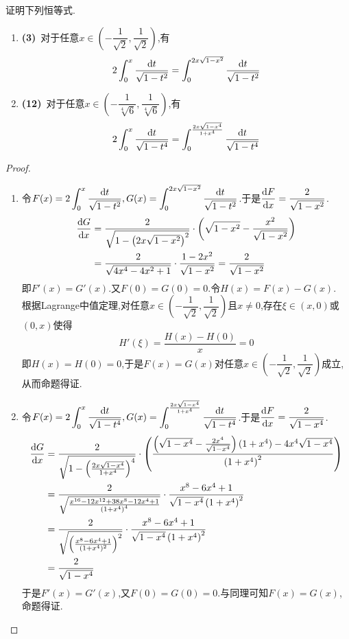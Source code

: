 \documentclass{ctexart}
\begin{document}
\begin{problem}[8.(15\songti{分})]
    证明下列恒等式.
    \begin{enumerate}[label=\tbf{(\arabic*)}]
        \item \textbf{(3)}\ 对于任意$x\in\left(-\dfrac{1}{\sqrt2},\dfrac{1}{\sqrt2}\right)$,有\[2\int_0^x\dfrac{\mathrm{d} t}{\sqrt{1-t^2}}=\int_0^{2x\sqrt{1-x^2}}\dfrac{\mathrm{d} t}{\sqrt{1-t^2}}\]
        \item \textbf{(12)}\ 对于任意$x\in\left(-\dfrac{1}{\sqrt[4]{6}},\dfrac{1}{\sqrt[4]{6}}\right)$,有\[2\int_0^x\dfrac{\mathrm{d} t}{\sqrt{1-t^4}}=\int_{0}^{\frac{2x\sqrt{1-x^4}}{1+x^4}}\dfrac{\mathrm{d} t}{\sqrt{1-t^4}}\]
    \end{enumerate}
\end{problem}
\begin{proof}
    \begin{enumerate}[label=\tbf{(\arabic*)}]
        \item 令$\displaystyle F(x)=2\int_0^x\dfrac{\mathrm{d} t}{\sqrt{1-t^2}},G(x)=\int_0^{2x\sqrt{1-x^2}}\dfrac{\mathrm{d} t}{\sqrt{1-t^2}}$.于是$\dfrac{\mathrm{d} F}{\mathrm{d} x}=\dfrac{2}{\sqrt{1-x^2}}$.
            \[\begin{aligned}
                \dfrac{\mathrm{d} G}{\mathrm{d} x}
                &= \dfrac{2}{\sqrt{1-\left(2x\sqrt{1-x^2}\right)^2}}\cdot\left(\sqrt{1-x^2}-\dfrac{x^2}{\sqrt{1-x^2}}\right) \\
                &= \dfrac{2}{\sqrt{4x^4-4x^2+1}}\cdot\dfrac{1-2x^2}{\sqrt{1-x^2}}=\dfrac{2}{\sqrt{1-x^2}}
            \end{aligned}\]
            即$F'(x)=G'(x)$.又$F(0)=G(0)=0$.令$H(x)=F(x)-G(x)$.\\
            根据Lagrange中值定理,对任意$x\in\left(-\dfrac{1}{\sqrt2},\dfrac{1}{\sqrt2}\right)$且$x\neq0$,存在$\xi\in(x,0)$或$(0,x)$使得
            \[H'(\xi)=\dfrac{H(x)-H(0)}{x}=0\]
            即$H(x)=H(0)=0$,于是$F(x)=G(x)$对任意$x\in\left(-\dfrac{1}{\sqrt2},\dfrac{1}{\sqrt2}\right)$成立,从而命题得证.
        \item 令$\displaystyle F(x)=2\int_0^x\dfrac{\mathrm{d} t}{\sqrt{1-t^4}},G(x)=\int_{0}^{\frac{2x\sqrt{1-x^4}}{1+x^4}}\dfrac{\mathrm{d} t}{\sqrt{1-t^4}}$.于是$\dfrac{\mathrm{d} F}{\mathrm{d} x}=\dfrac{2}{\sqrt{1-x^4}}$.
            \[\begin{aligned}
                \dfrac{\mathrm{d} G}{\mathrm{d} x}
                &= \dfrac{2}{\sqrt{1-\left(\frac{2x\sqrt{1-x^4}}{1+x^4}\right)^4}}\cdot\left(\dfrac{\left(\sqrt{1-x^4}-\frac{2x^4}{\sqrt{1-x^4}}\right)(1+x^4)-4x^4\sqrt{1-x^4}}{\left(1+x^4\right)^2}\right) \\
                &= \dfrac{2}{\sqrt{\frac{x^{16}-12x^{12}+38x^8-12x^4+1}{\left(1+x^4\right)^4}}}\cdot\dfrac{x^8-6x^4+1}{\sqrt{1-x^4}\left(1+x^4\right)^2} \\
                &= \dfrac{2}{\sqrt{\left(\frac{x^8-6x^4+1}{(1+x^4)^2}\right)^2}}\cdot\dfrac{x^8-6x^4+1}{\sqrt{1-x^4}\left(1+x^4\right)^2} \\
                &= \dfrac{2}{\sqrt{1-x^4}}
            \end{aligned}\]
            于是$F'(x)=G'(x)$,又$F(0)=G(0)=0$.与同理可知$F(x)=G(x)$,命题得证.
    \end{enumerate}
\end{proof}
\end{document}
